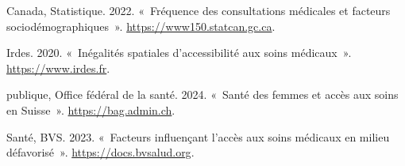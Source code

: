 \documentclass[
]{article}
\newlength{\cslhangindent}
\newlength{\cslentryspacingunit} %
\newenvironment{CSLReferences}[2] %
 {%
  \setlength{\parindent}{0pt}
  \ifodd #1
  \let\oldpar\par
  \def\par{\hangindent=\cslhangindent\oldpar}
  \fi
  \setlength{\parskip}{#2\cslentryspacingunit}
 }%
 {}
\begin{document}
\hypertarget{refs}{}
\begin{CSLReferences}{1}{0}
\leavevmode{}%
Canada, Statistique. 2022. {«~Fréquence des consultations médicales et
facteurs sociodémographiques~»}. \url{https://www150.statcan.gc.ca}.

\leavevmode{}%
Irdes. 2020. {«~Inégalités spatiales d'accessibilité aux soins
médicaux~»}. \url{https://www.irdes.fr}.

\leavevmode{}%
publique, Office fédéral de la santé. 2024. {«~Santé des femmes et accès
aux soins en Suisse~»}. \url{https://bag.admin.ch}.

\leavevmode{}%
Santé, BVS. 2023. {«~Facteurs influençant l'accès aux soins médicaux en
milieu défavorisé~»}. \url{https://docs.bvsalud.org}.

\end{CSLReferences}
\end{document}
